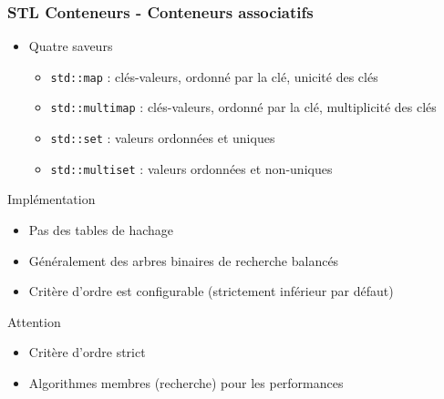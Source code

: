 \documentclass[C++.tex]{subfiles}
\begin{document}
\begin{frame}
	\frametitle{STL Conteneurs - Conteneurs associatifs}
	\begin{itemize}
		\item Quatre saveurs
		\begin{itemize}
			\item \lstinline|std::map| : clés-valeurs, ordonné par la clé, unicité des clés
			\item \lstinline|std::multimap| : clés-valeurs, ordonné par la clé, multiplicité des clés
			\item \lstinline|std::set| : valeurs ordonnées et uniques
			\item \lstinline|std::multiset| : valeurs ordonnées et non-uniques
		\end{itemize}
	\end{itemize}

	\begin{block}{Implémentation}
		\begin{itemize}
			\item Pas des tables de hachage
			\item Généralement des arbres binaires de recherche balancés
		\end{itemize}

	\end{block}

	\begin{itemize}
		\item Critère d'ordre est configurable (strictement inférieur par défaut)
	\end{itemize}

	\begin{alertblock}{Attention}
		\begin{itemize}
			\item Critère d'ordre strict
		\end{itemize}
	\end{alertblock}

	\begin{itemize}
		\item Algorithmes membres (recherche) pour les performances
	\end{itemize}
\end{frame}
\end{document}
